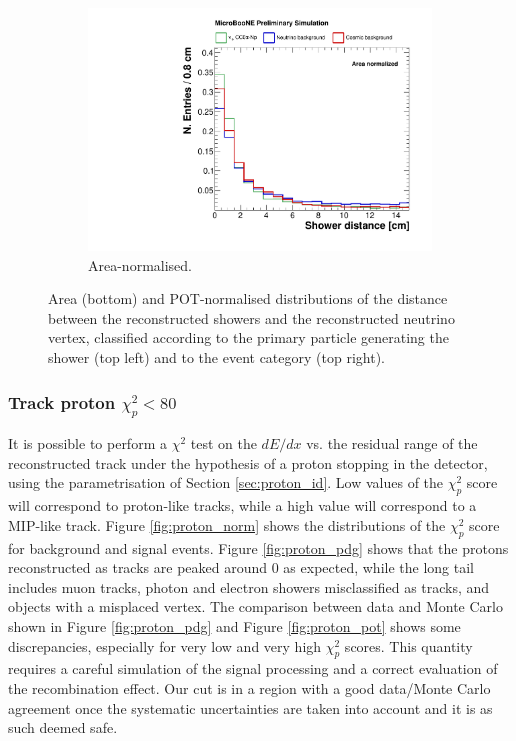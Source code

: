 \begin{figure}[htbp]
\begin{subfigure}{0.49\textwidth}
    \includegraphics[width=\linewidth]{figures/h_shower_distance_norm.pdf}
    \caption{Area-normalised.} \label{fig:showerd_norm}
  \end{subfigure}
  \caption{Area (bottom) and POT-normalised distributions of the distance between the reconstructed showers and the reconstructed neutrino vertex, classified according to the primary particle generating the shower (top left) and to the event category (top right).}
\end{figure}

\subsubsection*{Track proton $\chi_{p}^2 < 80$}
It is possible to perform a $\chi^2$ test on the $dE/dx$ vs. the residual range of the reconstructed track under the hypothesis of a proton stopping in the detector, using the parametrisation of Section \ref{sec:proton_id}. Low values of the $\chi_{p}^2$ score will correspond to proton-like tracks, while a high value will correspond to a MIP-like track. Figure \ref{fig:proton_norm} shows the distributions of the $\chi_{p}^2$ score for background and signal events. Figure \ref{fig:proton_pdg} shows that the protons reconstructed as tracks are peaked around 0 as expected, while the long tail includes muon tracks, photon and electron showers misclassified as tracks, and objects with a misplaced vertex. The comparison between data and Monte Carlo shown in Figure \ref{fig:proton_pdg} and Figure \ref{fig:proton_pot} shows some discrepancies, especially for very low and very high $\chi_{p}^2$ scores. This quantity requires a careful simulation of the signal processing and a correct evaluation of the recombination effect. Our cut is in a region with a good data/Monte Carlo agreement once the systematic uncertainties are taken into account and it is as such deemed safe.

